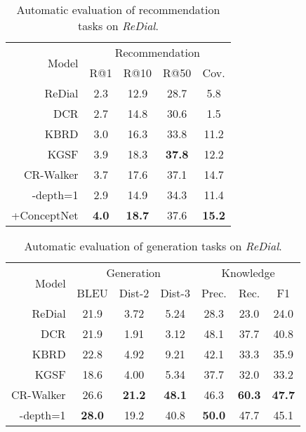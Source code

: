 \documentclass[11pt]{article}
\begin{document}
\begin{table}[!th]
    \centering
    \small
    \begin{tabular}{rcccc}
    \toprule
        \multirow{2}{*}[-0.04in]{Model} & \multicolumn{4}{c}{Recommendation} \\
    \cmidrule(lr){2-5} 
        & R@1 & R@10 & R@50 & Cov. \\
    \midrule
        ReDial & 2.3 & 12.9 & 28.7 & 5.8\\
        DCR & 2.7 & 14.8 & 30.6 & 1.5\\
        KBRD & 3.0 & 16.3 & 33.8 & 11.2 \\
        KGSF & 3.9 & 18.3 & \textbf{37.8} & 12.2\\
    \midrule
CR-Walker & 3.7 & 17.6 & 37.1 & 14.7 \\
        -depth=1  & 2.9 & 14.9 & 34.3 & 11.4\\
        +ConceptNet & \textbf{4.0} & \textbf{18.7} & 37.6 & \textbf{15.2}\\
    \bottomrule
    \end{tabular}
    \caption{Automatic evaluation of recommendation tasks on \textit{ReDial}.}
    \label{tab:rec_redial}
\end{table}


\begin{table}[!th]
    \centering
    \small
    \begin{tabular}{@{}r@{~~~~}c@{~~~~}c@{~~~~}c@{~~~~}c@{~~~~}c@{~~~~}c@{}}
    \toprule
        \multirow{2}{*}[-0.04in]{Model} & \multicolumn{3}{c}{Generation} & \multicolumn{3}{c}{Knowledge} \\
    \cmidrule(lr){2-4} \cmidrule(lr){5-7}
        & BLEU & Dist-2 & Dist-3 & Prec. & Rec. & F1 \\
    \midrule
        ReDial & 21.9 & 3.72 & 5.24 & 28.3 & 23.0 & 24.0 \\
        DCR & 21.9 & 1.91 & 3.12 & 48.1 & 37.7 & 40.8 \\
        KBRD & 22.8 & 4.92 & 9.21 & 42.1 & 33.3 & 35.9 \\
        KGSF & 18.6 & 4.00 & 5.34 & 37.7 & 32.0 & 33.2 \\
    \midrule
CR-Walker & 26.6 & \textbf{21.2} & \textbf{48.1} & 46.3 & \textbf{60.3} & \textbf{47.7} \\-depth=1  & \textbf{28.0} & 19.2 & 40.8 & \textbf{50.0} & 47.7 & 45.1 \\
    \bottomrule
    \end{tabular}
    \caption{Automatic evaluation of generation tasks on \textit{ReDial}.}
    \label{tab:gen_redial}
\end{table}
\end{document}
